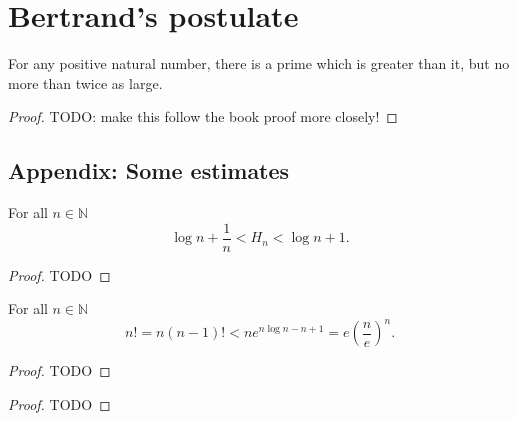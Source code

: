 \chapter{Bertrand's postulate}

\begin{theorem}
    \label{thm:bertrands_postulate}
    \leanok
    For any positive natural number, there is a prime which is greater than
    it, but no more than twice as large.
\end{theorem}
\begin{proof}
    \leanok
    TODO: make this follow the book proof more closely!
\end{proof}

\section{Appendix: Some estimates}

\begin{theorem}
    \label{thm:estimate_integral}
    \leanok
    For all \(n \in \mathbb{N}\)
    \[
    \log n + \frac 1 n < H_n < \log n + 1.
    \]
\end{theorem}
\begin{proof}
    TODO
\end{proof}


\begin{theorem}
    \label{thm:estimate_factorials}
    \leanok
    For all \(n \in \mathbb{N}\)
    \[
    n! = n(n -1)! < ne^{n \log n - n + 1}= e\left(\frac n e\right)^n.
    \]
\end{theorem}
\begin{proof}
    TODO
\end{proof}

\begin{theorem}
    \label{thm:estimate_binomial_coefficient}
    \leanok
\end{theorem}
\begin{proof}
    TODO
\end{proof}
